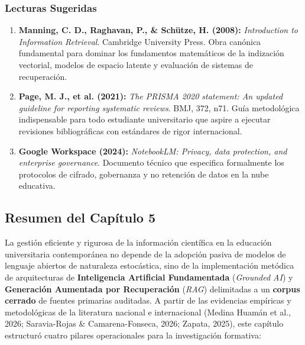 \subsubsection*{Lecturas Sugeridas}
\begin{enumerate}[leftmargin=1.5em, itemsep=0.15em, topsep=0.15em]
    \item \textbf{Manning, C. D., Raghavan, P., \& Schütze, H. (2008):} \textit{Introduction to Information Retrieval}. Cambridge University Press. Obra canónica fundamental para dominar los fundamentos matemáticos de la indización vectorial, modelos de espacio latente y evaluación de sistemas de recuperación.
    \item \textbf{Page, M. J., et al. (2021):} \textit{The PRISMA 2020 statement: An updated guideline for reporting systematic reviews}. BMJ, 372, n71. Guía metodológica indispensable para todo estudiante universitario que aspire a ejecutar revisiones bibliográficas con estándares de rigor internacional.
    \item \textbf{Google Workspace (2024):} \textit{NotebookLM: Privacy, data protection, and enterprise governance}. Documento técnico que especifica formalmente los protocolos de cifrado, gobernanza y no retención de datos en la nube educativa.
\end{enumerate}

\newpage
{}

\subsection*{Resumen del Capítulo 5}

La gestión eficiente y rigurosa de la información científica en la educación universitaria contemporánea no depende de la adopción pasiva de modelos de lenguaje abiertos de naturaleza estocástica, sino de la implementación metódica de arquitecturas de \textbf{Inteligencia Artificial Fundamentada} (\textit{Grounded AI}) y \textbf{Generación Aumentada por Recuperación} (\textit{RAG}) delimitadas a un \textbf{corpus cerrado} de fuentes primarias auditadas. A partir de las evidencias empíricas y metodológicas de la literatura nacional e internacional (Medina Huamán et al., 2026; Saravia-Rojas \& Camarena-Fonseca, 2026; Zapata, 2025), este capítulo estructuró cuatro pilares operacionales para la investigación formativa:

